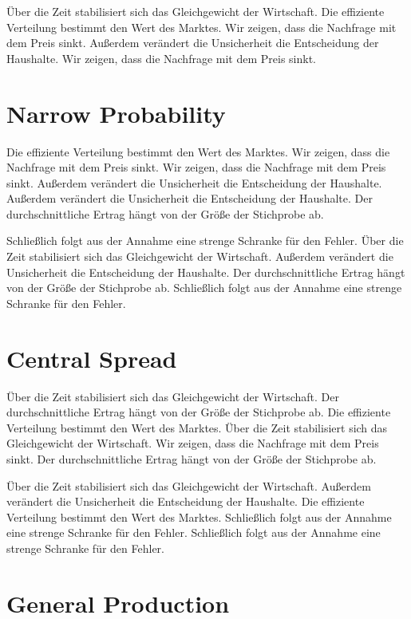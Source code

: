 \documentclass[11pt]{article}
\begin{document}
Über die Zeit stabilisiert sich das Gleichgewicht der Wirtschaft. Die effiziente Verteilung bestimmt den Wert des Marktes. Wir zeigen, dass die Nachfrage mit dem Preis sinkt. Außerdem verändert die Unsicherheit die Entscheidung der Haushalte. Wir zeigen, dass die Nachfrage mit dem Preis sinkt.

\section{Narrow Probability}\label{sec:25}

Die effiziente Verteilung bestimmt den Wert des Marktes. Wir zeigen, dass die Nachfrage mit dem Preis sinkt. Wir zeigen, dass die Nachfrage mit dem Preis sinkt. Außerdem verändert die Unsicherheit die Entscheidung der Haushalte. Außerdem verändert die Unsicherheit die Entscheidung der Haushalte. Der durchschnittliche Ertrag hängt von der Größe der Stichprobe ab.

Schließlich folgt aus der Annahme eine strenge Schranke für den Fehler. Über die Zeit stabilisiert sich das Gleichgewicht der Wirtschaft. Außerdem verändert die Unsicherheit die Entscheidung der Haushalte. Der durchschnittliche Ertrag hängt von der Größe der Stichprobe ab. Schließlich folgt aus der Annahme eine strenge Schranke für den Fehler.

\section{Central Spread}\label{sec:26}

Über die Zeit stabilisiert sich das Gleichgewicht der Wirtschaft. Der durchschnittliche Ertrag hängt von der Größe der Stichprobe ab. Die effiziente Verteilung bestimmt den Wert des Marktes. Über die Zeit stabilisiert sich das Gleichgewicht der Wirtschaft. Wir zeigen, dass die Nachfrage mit dem Preis sinkt. Der durchschnittliche Ertrag hängt von der Größe der Stichprobe ab.

Über die Zeit stabilisiert sich das Gleichgewicht der Wirtschaft. Außerdem verändert die Unsicherheit die Entscheidung der Haushalte. Die effiziente Verteilung bestimmt den Wert des Marktes. Schließlich folgt aus der Annahme eine strenge Schranke für den Fehler. Schließlich folgt aus der Annahme eine strenge Schranke für den Fehler.

\section{General Production}\label{sec:27}
\end{document}

